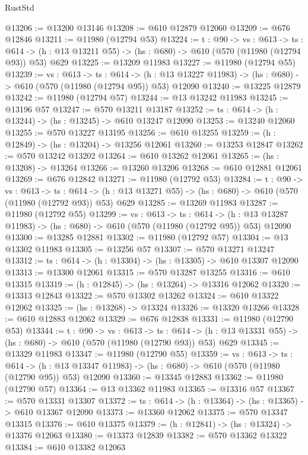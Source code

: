 \begin{lexlean}{RustStd}
\begin{coremodule}
@13206 := @13200 @13146
@13208 := @610 @12879 @12060
@13209 := @676 @12846
@13211 := @11980 (@12794 @53)
@13224 := {t : @90} ->
  {vs : @613} ->
  {ts : @614} -> (h : @13 @13211 @55) -> (hs : @680) -> @610 (@570 (@11980 (@12794 @93)) @53) @629
@13225 := @13209 @11983
@13227 := @11980 (@12794 @55)
@13239 := {vs : @613} ->
  {ts : @614} ->
  (h : @13 @13227 @11983) -> (hs : @680) -> @610 (@570 (@11980 (@12794 @95)) @53) @12090
@13240 := @13225 @12879
@13242 := @11980 (@12794 @57)
@13244 := @13 @13242 @11983
@13245 := @13196 @57
@13247 := @570 @13211 @13187
@13252 := {ts : @614} -> (h : @13244) -> (hs : @13245) -> @610 @13247 @12090
@13253 := @13240 @12060
@13255 := @570 @13227 @13195
@13256 := @610 @13255
@13259 := (h : @12849) -> (hs : @13204) -> @13256 @12061
@13260 := @13253 @12847
@13262 := @570 @13242 @13202
@13264 := @610 @13262 @12061
@13265 := (hs : @13208) -> @13264
@13266 := @13260 @13206
@13268 := @610 @12881 @12061
@13269 := @676 @12842
@13271 := @11980 (@12792 @53)
@13284 := {t : @90} ->
  {vs : @613} ->
  {ts : @614} -> (h : @13 @13271 @55) -> (hs : @680) -> @610 (@570 (@11980 (@12792 @93)) @53) @629
@13285 := @13269 @11983
@13287 := @11980 (@12792 @55)
@13299 := {vs : @613} ->
  {ts : @614} ->
  (h : @13 @13287 @11983) -> (hs : @680) -> @610 (@570 (@11980 (@12792 @95)) @53) @12090
@13300 := @13285 @12881
@13302 := @11980 (@12792 @57)
@13304 := @13 @13302 @11983
@13305 := @13256 @57
@13307 := @570 @13271 @13247
@13312 := {ts : @614} -> (h : @13304) -> (hs : @13305) -> @610 @13307 @12090
@13313 := @13300 @12061
@13315 := @570 @13287 @13255
@13316 := @610 @13315
@13319 := (h : @12845) -> (hs : @13264) -> @13316 @12062
@13320 := @13313 @12843
@13322 := @570 @13302 @13262
@13324 := @610 @13322 @12062
@13325 := (hs : @13268) -> @13324
@13326 := @13320 @13266
@13328 := @610 @12883 @12062
@13329 := @676 @12838
@13331 := @11980 (@12790 @53)
@13344 := {t : @90} ->
  {vs : @613} ->
  {ts : @614} -> (h : @13 @13331 @55) -> (hs : @680) -> @610 (@570 (@11980 (@12790 @93)) @53) @629
@13345 := @13329 @11983
@13347 := @11980 (@12790 @55)
@13359 := {vs : @613} ->
  {ts : @614} ->
  (h : @13 @13347 @11983) -> (hs : @680) -> @610 (@570 (@11980 (@12790 @95)) @53) @12090
@13360 := @13345 @12883
@13362 := @11980 (@12790 @57)
@13364 := @13 @13362 @11983
@13365 := @13316 @57
@13367 := @570 @13331 @13307
@13372 := {ts : @614} -> (h : @13364) -> (hs : @13365) -> @610 @13367 @12090
@13373 := @13360 @12062
@13375 := @570 @13347 @13315
@13376 := @610 @13375
@13379 := (h : @12841) -> (hs : @13324) -> @13376 @12063
@13380 := @13373 @12839
@13382 := @570 @13362 @13322
@13384 := @610 @13382 @12063

\end{coremodule}
\end{lexlean}
